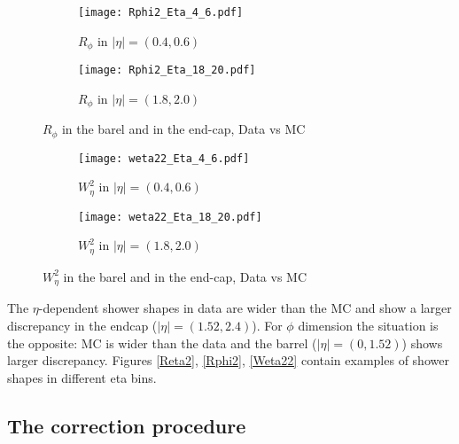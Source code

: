     \begin{figure}[htbp]
	\begin{subfigure}[t]{0.5\textwidth}
		\texttt{[image: Rphi2\_Eta\_4\_6.pdf]}
		\caption{$R_{\phi}$ in $|\eta| = (0.4,0.6)$ }
		\label{fig::rphi_norew_04}
	\end{subfigure}
	\hfill
	\begin{subfigure}[t]{0.5\textwidth} 
		\texttt{[image: Rphi2\_Eta\_18\_20.pdf]}
		\caption{$R_{\phi}$ in $|\eta| = (1.8,2.0)$ }
		\label{fig::rphi_norew_18}
	\end{subfigure}
	\caption{$R_{\phi}$ in the barel and in the end-cap, Data vs MC}
	\label{fig::rphi_norew}
\end{figure}
  
    \begin{figure}[htbp]
	\begin{subfigure}[t]{0.5\textwidth}
		\texttt{[image: weta22\_Eta\_4\_6.pdf]}
		\caption{$W_{\eta}^2$ in $|\eta| = (0.4,0.6)$ }
		\label{fig::weta2_norew_04}
	\end{subfigure}
	\hfill
	\begin{subfigure}[t]{0.5\textwidth} 
		\texttt{[image: weta22\_Eta\_18\_20.pdf]}
		\caption{$W_{\eta}^2$ in $|\eta| = (1.8,2.0)$ }
		\label{fig::weta2_norew_18}
	\end{subfigure}
	\caption{$W_{\eta}^2$ in the barel and in the end-cap, Data vs MC}
	\label{fig::weta2_norew}
\end{figure}



  The $\eta$-dependent shower shapes in data are wider than the MC and show a larger discrepancy in the endcap ($|\eta| = (1.52,2.4)$). For $\phi$ dimension the situation is the opposite: MC is wider than the data and the barrel ($|\eta| = (0,1.52)$) shows larger discrepancy. Figures \ref{Reta2}, \ref{Rphi2}, \ref{Weta22} contain examples of shower shapes in different eta bins. 
  \subsection{The correction procedure}
